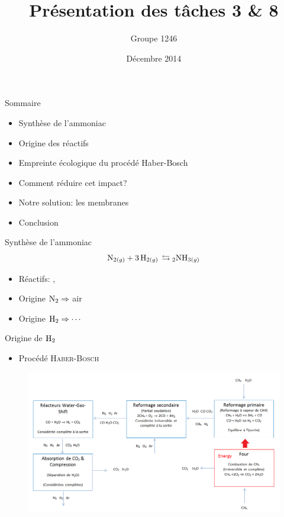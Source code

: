 \documentclass{beamer}
\title{Présentation des tâches 3 \& 8 }
\author{Groupe 1246}
\institute{École Polytechnique de Louvain}
\date{Décembre 2014}
\begin{document}
\begin{frame}{}
\maketitle
\end{frame}

\begin{frame}{Sommaire}
\begin{itemize}
\item {Synthèse de l'ammoniac}
\item {Origine des réactifs}
\item {Empreinte écologique du procédé Haber-Bosch}
\item {Comment réduire cet impact?}
\item {Notre solution: les membranes}
\item {Conclusion}
\end{itemize}
\end{frame}

\begin{frame}{Synthèse de l'ammoniac}
$$\ce{N_{2(g)} + 3H_{2(g)} \leftrightarrows 2NH_{3(g)}}$$

\begin{itemize}
\item{Réactifs: , }
\item{Origine $\ce{N_2} \Rightarrow$ air}
\item{Origine $\ce{H_2} \Rightarrow \cdots$}
\end{itemize}
\end{frame}

\begin{frame}{Origine de $\ce{H_2}$}
\begin{itemize}
\item{Procédé \textsc{Haber-Bosch}}
\end{itemize}

\begin{figure}[ht!]
 \centering
 \includegraphics[scale=0.35]{PrHB2.png}
 \label{scheme}
\end{figure}
\end{frame}
\end{document}
